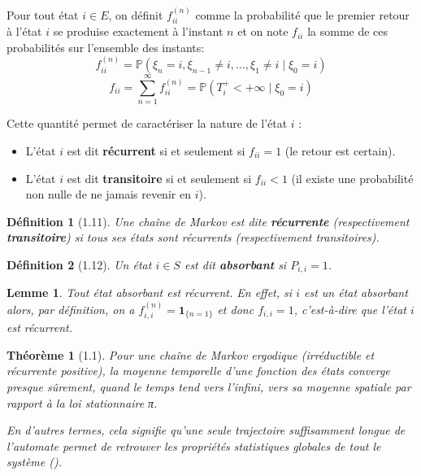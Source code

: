 \documentclass[11pt,a4paper]{article}
\newtheorem*{definition}{Définition}
\newtheorem*{lemma}{Lemme}
\newtheorem*{theorem}{Théorème}
\begin{document}
Pour tout état $i \in E$, on définit $f_{ii}^{(n)}$ comme la
probabilité que le premier retour à l'état $i$ se produise exactement
à l'instant $n$ et on note $f_{ii}$ la somme de ces probabilités sur
l'ensemble des instants:
\begin{equation}
f_{ii}^{(n)} = \mathbb{P}(\xi_n = i, \xi_{n-1} \neq i, \dots, \xi_1 \neq i \mid \xi_0 = i)
\end{equation}
\begin{equation}
f_{ii} = \sum_{n=1}^{\infty} f_{ii}^{(n)} = \mathbb{P}(T_i^+ < +\infty \mid \xi_0 = i)
\end{equation}

Cette quantité permet de caractériser la nature de l'état $i$ :
\begin{itemize}
    \item L'état $i$ est dit \textbf{récurrent} si et seulement si $f_{ii} = 1$ (le retour est certain).
    \item L'état $i$ est dit \textbf{transitoire} si et seulement si
      $f_{ii} < 1$ (il existe une probabilité non nulle de ne jamais
      revenir en $i$).
\end{itemize}

\begin{definition}[1.11]
  Une chaîne de Markov est dite \textbf{récurrente} (respectivement
  \textbf{transitoire}) si tous ses états sont récurrents
  (respectivement transitoires).
\end{definition}

\begin{definition}[1.12]
    Un état $i \in S$ est dit \textbf{absorbant} si $P_{i,i} = 1$.
\end{definition}

\begin{lemma}
Tout état absorbant est récurrent. En effet, si $i$ est un état
absorbant alors, par définition, on a $f_{i,i}^{(n)} =
\mathbf{1}_{\{n=1\}}$ et donc $f_{i,i} = 1$, c'est-à-dire que l'état
$i$ est récurrent.
\end{lemma}

\begin{theorem}[1.1]
  Pour une chaîne de Markov ergodique (irréductible et récurrente
  positive), la moyenne temporelle d'une fonction des états converge
  presque sûrement, quand le temps tend vers l'infini, vers sa
  moyenne spatiale par rapport à la loi stationnaire π.

  En d'autres termes, cela signifie qu'une seule trajectoire
  suffisamment longue de l'automate permet de retrouver les propriétés
  statistiques globales de tout le système (\cite{holley1975}).
\end{theorem}
\end{document}
